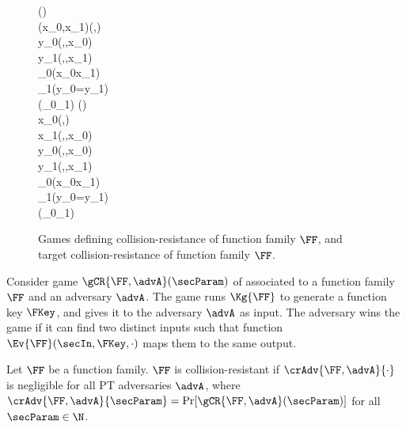 
\begin{figure}[t]
{
\vspace{-1.0em} %
  {
    \FKey\getsr\Kg{\FF}(\secIn)\\
	(x_0,x_1)\getsr\advA(\secIn,\FKey)\\
	y_0\gets\Ev{\FF}(\secIn,\FKey,x_0)\\
	y_1\gets\Ev{\FF}(\secIn,\FKey,x_1)\\
	\win_0\gets(x_0\neq x_1)\\
	\win_1\gets(y_0=y_1)\\
	\pcreturn (\win_0\land\win_1)
  }
}
{
\vspace{-1.0em} %
  {
    \FKey\getsr\Kg{\FF}(\secIn)\\
	x_0\getsr\Dom{\FF}(\secParam,\FKey)\\
	x_1\getsr\advA(\secIn,\FKey,x_0)\\
	y_0\gets\Ev{\FF}(\secIn,\FKey,x_0)\\
	y_1\gets\Ev{\FF}(\secIn,\FKey,x_1)\\
	\win_0\gets(x_0\neq x_1)\\
	\win_1\gets(y_0=y_1)\\
	\pcreturn (\win_0\land\win_1)
  }
}
\figvspace
\caption{Games defining
           collision-resistance of function family $\FF$,
		   and target collision-resistance of function family $\FF$.}
\label{fig-ff-cr}
\label{fig-ff-tcr}
\hrulefill
\end{figure}

Consider game $\gCR{\FF,\advA}(\secParam)$ of  associated to a function family $\FF$ and an adversary $\advA$.
The game runs $\Kg{\FF}$ to generate a function key $\FKey$, and gives it to the adversary $\advA$ as input.
The adversary wins the game if it can find two distinct inputs such that function $\Ev{\FF}(\secIn,\FKey,\cdot)$ maps them to the same output.
\begin{defn}
  Let $\FF$ be a function family.
  $\FF$ is collision-resistant if $\crAdv{\FF,\advA}{\cdot}$ is negligible for all PT adversaries $\advA$,
  where $\crAdv{\FF,\advA}{\secParam}=\Pr[\gCR{\FF,\advA}(\secParam)]$ for all $\secParam\in\N$.
\end{defn}

